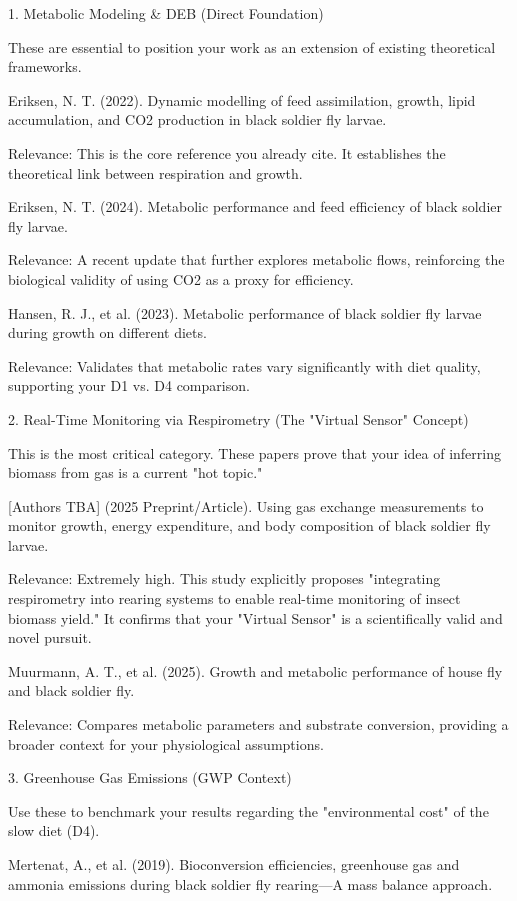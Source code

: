1. Metabolic Modeling & DEB (Direct Foundation)

These are essential to position your work as an extension of existing theoretical frameworks.

    Eriksen, N. T. (2022). Dynamic modelling of feed assimilation, growth, lipid accumulation, and CO2 production in black soldier fly larvae.

        Relevance: This is the core reference you already cite. It establishes the theoretical link between respiration and growth.

    Eriksen, N. T. (2024). Metabolic performance and feed efficiency of black soldier fly larvae.

        Relevance: A recent update that further explores metabolic flows, reinforcing the biological validity of using CO2 as a proxy for efficiency.

    Hansen, R. J., et al. (2023). Metabolic performance of black soldier fly larvae during growth on different diets.

        Relevance: Validates that metabolic rates vary significantly with diet quality, supporting your D1 vs. D4 comparison.

2. Real-Time Monitoring via Respirometry (The "Virtual Sensor" Concept)

This is the most critical category. These papers prove that your idea of inferring biomass from gas is a current "hot topic."

    [Authors TBA] (2025 Preprint/Article). Using gas exchange measurements to monitor growth, energy expenditure, and body composition of black soldier fly larvae.

        Relevance: Extremely high. This study explicitly proposes "integrating respirometry into rearing systems to enable real-time monitoring of insect biomass yield." It confirms that your "Virtual Sensor" is a scientifically valid and novel pursuit.

    Muurmann, A. T., et al. (2025). Growth and metabolic performance of house fly and black soldier fly.

        Relevance: Compares metabolic parameters and substrate conversion, providing a broader context for your physiological assumptions.

3. Greenhouse Gas Emissions (GWP Context)

Use these to benchmark your results regarding the "environmental cost" of the slow diet (D4).

    Mertenat, A., et al. (2019). Bioconversion efficiencies, greenhouse gas and ammonia emissions during black soldier fly rearing—A mass balance approach.

